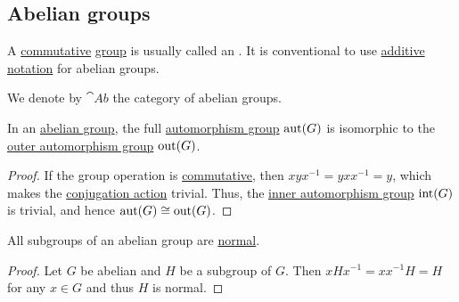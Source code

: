 \subsection{Abelian groups}\label{subsec:abelian_groups}

\begin{definition}\label{def:abelian_group}
  A \hyperref[def:magma/commutative]{commutative} \hyperref[def:group]{group} is usually called an . It is conventional to use \hyperref[rem:additive_magma]{additive notation} for abelian groups.

  We denote by \( \cat{Ab} \) the category of abelian groups.
\end{definition}

\begin{proposition}\label{thm:abelian_outer_automorphism_group}
  In an \hyperref[def:abelian_group]{abelian group}, the full \hyperref[def:automorphism_group]{automorphism group} \( \operatorname{aut}(G) \) is isomorphic to the \hyperref[def:inner_and_outer_automorphisms]{outer automorphism group} \( \operatorname{out}(G) \).
\end{proposition}
\begin{proof}
  If the group operation is \hyperref[def:magma/commutative]{commutative}, then \( xyx^{-1} = yxx^{-1} = y \), which makes the \hyperref[def:inner_and_outer_automorphisms]{conjugation action} trivial. Thus, the \hyperref[def:inner_and_outer_automorphisms]{inner automorphism group} \( \operatorname{int}(G) \) is trivial, and hence \( \operatorname{aut}(G) \cong \operatorname{out}(G) \).
\end{proof}

\begin{proposition}\label{thm:abelian_normal_subgroups}
  All subgroups of an abelian group are \hyperref[def:normal_subgroup]{normal}.
\end{proposition}
\begin{proof}
  Let \( G \) be abelian and \( H \) be a subgroup of \( G \). Then \( x H x^{-1} = xx^{-1} H = H \) for any \( x \in G \) and thus \( H \) is normal.
\end{proof}

